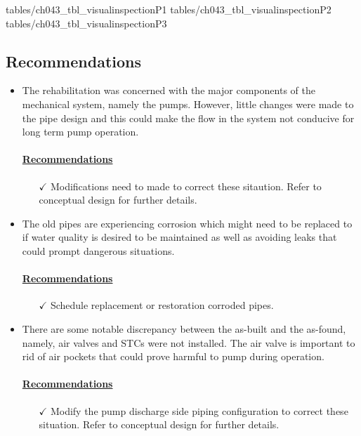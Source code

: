
 {tables/ch043_tbl_visualinspectionP1}
 {tables/ch043_tbl_visualinspectionP2}
 {tables/ch043_tbl_visualinspectionP3}


\subsection{Recommendations}

\begin{itemize}
\item The rehabilitation was concerned with the major components of the mechanical system, namely the pumps. However, little changes were made to the pipe design and this could make the flow in the system not conducive for long term pump operation.

\paragraph{\underline{Recommendations}} 
\begin{itemize}
	\item [$\checkmark$] Modifications need to made to correct these sitaution. Refer to conceptual design for further details.
\end{itemize}

\item The old pipes are experiencing corrosion which might need to be replaced to if water quality is desired to be maintained as well as avoiding leaks that could prompt dangerous situations.

\paragraph{\underline{Recommendations}}
\begin{itemize}
	\item [$\checkmark$] Schedule replacement or restoration corroded pipes.
\end{itemize}


\item There are some notable discrepancy between the as-built and the as-found, namely, air valves and STCs were not installed. The air valve is important to rid of air pockets that could prove harmful to pump during operation. 


\paragraph{\underline{Recommendations}}
\begin{itemize}
	\item [$\checkmark$] Modify the pump discharge side piping configuration to correct these situation. Refer to conceptual design for further details.


\end{itemize}
\end{itemize}
